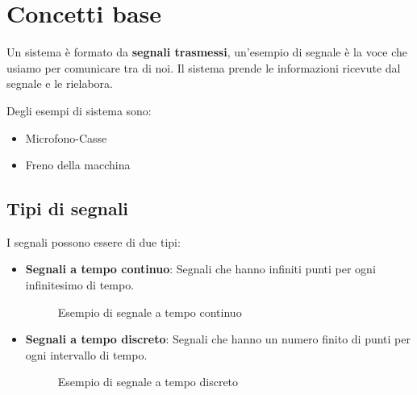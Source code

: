 \documentclass[a4paper]{article}
\begin{document}


\tableofcontents
\pagebreak

\section{Concetti base}
Un sistema è formato da \textbf{segnali trasmessi}, un'esempio di segnale
è la voce che usiamo per comunicare tra di noi. Il sistema prende le informazioni
ricevute dal segnale e le rielabora. 

\noindent 
Degli esempi di sistema sono:
\begin{itemize}
  \item Microfono-Casse
  \item Freno della macchina
\end{itemize}

\subsection{Tipi di segnali}
I segnali possono essere di due tipi:

\begin{itemize}
  \item \textbf{Segnali a tempo continuo}: Segnali che hanno infiniti punti per ogni
    infinitesimo di tempo.
    \begin{figure}[H]
      \centering
      \caption{Esempio di segnale a tempo continuo}
    \end{figure}
  \item \textbf{Segnali a tempo discreto}: Segnali che hanno un numero finito di punti
    per ogni intervallo di tempo.
    \begin{figure}[H]
      \centering
      \caption{Esempio di segnale a tempo discreto}
    \end{figure}

\end{itemize}
\end{document}
